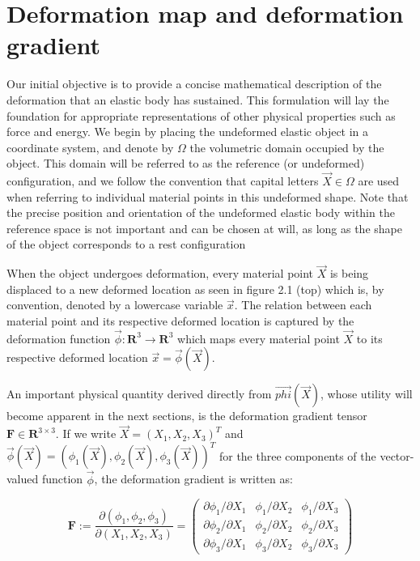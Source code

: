 \section{Deformation map and deformation gradient}
Our initial objective is to provide a concise mathematical description of the deformation that an elastic body has sustained. This formulation will 
lay the foundation for appropriate representations of other physical properties such as force and energy. We begin by placing the undeformed elastic 
object in a coordinate system, and denote by $\Omega$ the volumetric domain occupied by the object. This domain will be referred to as the reference 
(or undeformed) configuration, and we follow the convention that capital letters $\vec{X} \in \Omega$ are used when referring to individual material
points in this undeformed shape. Note that the precise position and orientation of the undeformed elastic body within the reference space is not important 
and can be chosen at will, as long as the shape of the object corresponds to a rest configuration

When the object undergoes deformation, every material point $\vec{X}$ is being displaced to a new deformed location as seen in figure 2.1 (top) which is, 
by convention, denoted by a lowercase variable $\vec{x}$. The relation between each material point and its respective deformed location is captured by 
the deformation function $\vec{\phi} : \mathbf{R}^3 \rightarrow \mathbf{R}^3$ which maps every material point $\vec{X}$ to its respective deformed 
location $\vec{x}=\vec{\phi}(\vec{X})$.

An important physical quantity derived directly from $\vec{phi}(\vec{X})$, whose utility will become apparent in the next sections, is the deformation 
gradient tensor $\mathbf{F} \in \mathbf{R}^{3 \times 3}$. If we write $\vec{X} =(X_1,X_2,X_3)^T $ and 
$\vec{\phi}(\vec{X})=(\phi_1(\vec{X}), \phi_2(\vec{X}), \phi_3(\vec{X}))^T$ for the three components of the vector-valued function $\vec{\phi}$,
the deformation gradient is written as: 

\begin{equation}
 \mathbf{F} := \frac{\partial(\phi_1, \phi_2, \phi_3)}{\partial (X_1, X_2, X_3)}= 
 \left(\begin{array}{ccc} 
      \partial \phi_1/\partial X_1 & \phi_1/\partial X_2 & \phi_1/\partial X_3 \\
      \partial \phi_2/\partial X_1 & \phi_2/\partial X_2 & \phi_2/\partial X_3 \\
      \partial \phi_3/\partial X_1 & \phi_3/\partial X_2 & \phi_3/\partial X_3 
      \end{array} \right)
\end{equation}



